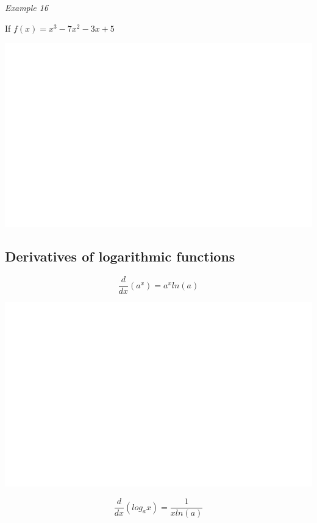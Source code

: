 \documentclass[]{book}
\begin{document}
\emph{Example 16}

If \(f(x)=x^3-7x^2-3x+5\)

\begin{center}\includegraphics[width=1\linewidth]{figure/LB26-1} \end{center}

\hypertarget{derivatives-of-logarithmic-functions}{%
\subsection{Derivatives of logarithmic functions}\label{derivatives-of-logarithmic-functions}}

\[\frac{d}{dx}(a^x)= a^xln(a)\]

\begin{center}\includegraphics[width=1\linewidth]{figure/LB27-1} \end{center}

\[\frac{d}{dx}(log_ax)= \frac{1}{xln(a)}\]
\end{document}
